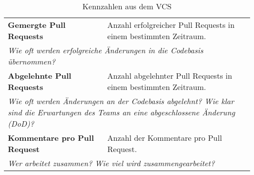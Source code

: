 \begin{table}[H]
\begin{tabular}{p{6.5cm}p{8cm}}
    \textbf{Gemergte Pull Requests} & Anzahl erfolgreicher Pull Requests in einem bestimmten Zeitraum. \\ 
    \multicolumn{2}{p{14.5cm}}{\textit{Wie oft werden erfolgreiche Änderungen in die Codebasis übernommen?}} \\ \midrule
    \textbf{Abgelehnte Pull Requests} & Anzahl abgelehnter Pull Requests in einem bestimmten Zeitraum. \\ 
    \multicolumn{2}{p{14.5cm}}{\textit{Wie oft werden Änderungen an der Codebasis abgelehnt? \newline Wie klar sind die Erwartungen des Teams an eine abgeschlossene Änderung (\ac{DoD})?}} \\ \midrule
    \textbf{Kommentare pro Pull Request} & Anzahl der Kommentare pro Pull Request. \\ 
    \multicolumn{2}{p{14.5cm}}{\textit{Wer arbeitet zusammen? \newline Wie viel wird zusammengearbeitet?}} \\ \bottomrule
    \end{tabular}
    \caption{Kennzahlen aus dem \ac{VCS}}\label{metrics-table-vcs}
  \end{table}
  
